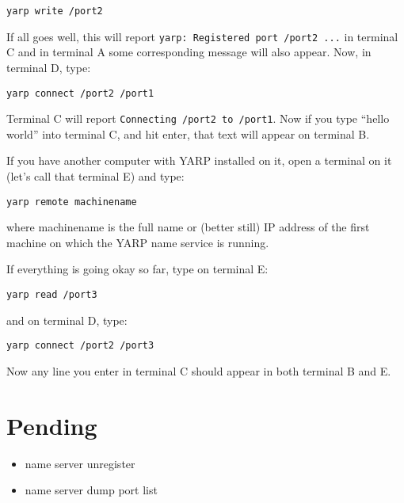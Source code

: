 \documentclass[a4]{article}
\newcommand{\ctt}[1]{{\tt #1}}
\begin{document}
\begin{verbatim}
yarp write /port2
\end{verbatim}

If all goes well, this will report \ctt{yarp: Registered port /port2 ...} in
terminal C and in terminal A some corresponding message will also
appear.
%
Now, in terminal D, type:

\begin{verbatim}
yarp connect /port2 /port1
\end{verbatim}

Terminal C will report \ctt{Connecting /port2 to /port1}.  Now if
you type ``hello world'' into terminal C, and hit enter, that text
will appear on terminal B.

If you have another computer with YARP installed on it, open a
terminal on it (let's call that terminal E) and type:

\begin{verbatim}
yarp remote machinename
\end{verbatim}

where machinename is the full name or (better still) IP address of the
first machine on which the YARP name service is running.  

If everything is going okay so far, type on terminal E:
%
\begin{verbatim}
yarp read /port3
\end{verbatim}
%
and on terminal D, type:
%
\begin{verbatim}
yarp connect /port2 /port3
\end{verbatim}
%
Now any line you enter in terminal C should appear in both terminal B and E.




\section{Pending}

\begin{itemize}

\item name server unregister

\item name server dump port list

\end{itemize}
\end{document}
